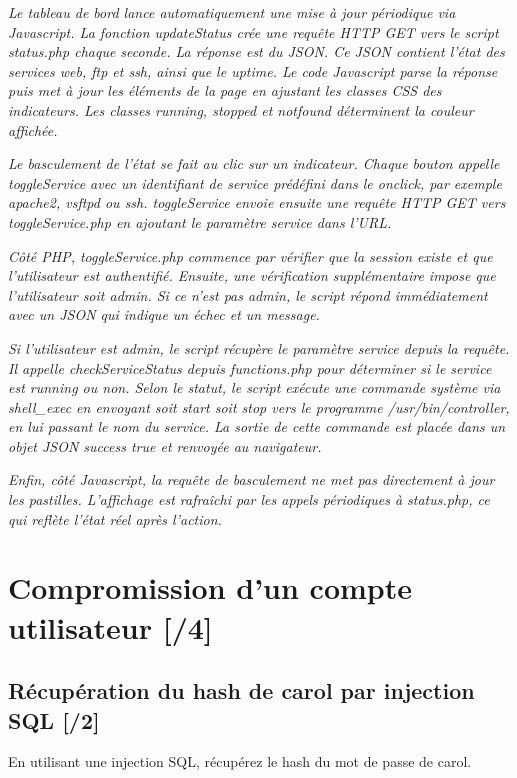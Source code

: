 \documentclass[a4paper, 12pt, french]{article}
\begin{document}
\vspace{0.8em}
\medskip
\textit{Le tableau de bord lance automatiquement une mise à jour périodique via Javascript. La fonction updateStatus crée une requête HTTP GET vers le script status.php chaque seconde. La réponse est du JSON. Ce JSON contient l'état des services web, ftp et ssh, ainsi que le uptime. Le code Javascript parse la réponse puis met à jour les éléments de la page en ajustant les classes CSS des indicateurs. Les classes running, stopped et notfound déterminent la couleur affichée.}

\medskip
\textit{Le basculement de l'état se fait au clic sur un indicateur. Chaque bouton appelle toggleService avec un identifiant de service prédéfini dans le onclick, par exemple apache2, vsftpd ou ssh. toggleService envoie ensuite une requête HTTP GET vers toggleService.php en ajoutant le paramètre service dans l'URL.}

\medskip
\textit{Côté PHP, toggleService.php commence par vérifier que la session existe et que l'utilisateur est authentifié. Ensuite, une vérification supplémentaire impose que l'utilisateur soit admin. Si ce n'est pas admin, le script répond immédiatement avec un JSON qui indique un échec et un message.}

\medskip
\textit{Si l'utilisateur est admin, le script récupère le paramètre service depuis la requête. Il appelle checkServiceStatus depuis functions.php pour déterminer si le service est running ou non. Selon le statut, le script exécute une commande système via shell\_exec en envoyant soit start soit stop vers le programme /usr/bin/controller, en lui passant le nom du service. La sortie de cette commande est placée dans un objet JSON success true et renvoyée au navigateur.}

\medskip
\textit{Enfin, côté Javascript, la requête de basculement ne met pas directement à jour les pastilles. L'affichage est rafraîchi par les appels périodiques à status.php, ce qui reflète l'état réel après l'action.}

\section{Compromission d'un compte utilisateur [/4]}

\subsection{Récupération du hash de carol par injection SQL [/2]}
En utilisant une injection SQL, récupérez le hash du mot de passe de carol.
\end{document}

